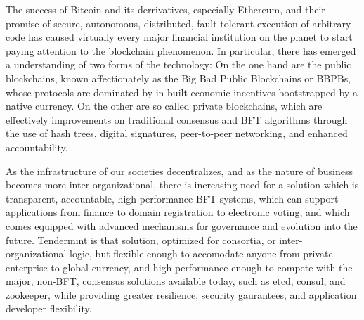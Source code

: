 The success of Bitcoin and its derrivatives, especially Ethereum, and their promise of secure, autonomous, distributed, fault-tolerant execution of arbitrary code has caused virtually every major financial institution on the planet to start paying attention to the blockchain phenomenon. 
In particular, there has emerged a understanding of two forms of the technology:
On the one hand are the public blockchains, known affectionately as the Big Bad Public Blockchains or BBPBs, 
whose protocols are dominated by in-built economic incentives bootstrapped by a native currency.
On the other are so called private blockchains, which are effectively improvements on traditional consensus and BFT algorithms through the use of hash trees, digital signatures, peer-to-peer networking, and enhanced accountability.

As the infrastructure of our societies decentralizes, and as the nature of business becomes more inter-organizational,
there is increasing need for a solution which is transparent, accountable, high performance BFT systems, which can support applications from finance to domain registration to electronic voting,
and which comes equipped with advanced mechanisms for governance and evolution into the future.
Tendermint is that solution, optimized for consortia, or inter-organizational logic, but flexible enough to accomodate anyone from private enterprise to global currency,
and high-performance enough to compete with the major, non-BFT, consensus solutions available today, such as etcd, consul, and zookeeper, while providing greater resilience, security gaurantees, and application developer flexibility.

